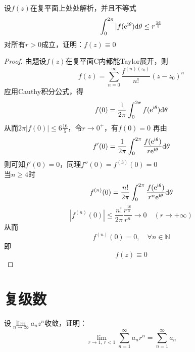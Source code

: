 \begin{proposition}

    设$f(z)$在复平面上处处解析，并且不等式
    $$\int_{0}^{2\pi}{|f(\mathrm{e^{\mathrm{i} \theta}})}\mathrm{d} \theta \leq r^{\frac{16}{5}} $$
    对所有$r > 0$成立，证明：$f(z) \equiv 0$

\end{proposition}

\begin{proof}

    由题设$f(z)$在复平面$\mathrm{C}$内都能\textup{Taylor}展开，则
    $$f(z) = \sum_{n=0}^{\infty}{\dfrac{f^{(n)(z_0)}}{n!}(z - z_0)^n}$$
    应用\textup{Cauthy}积分公式，得
    $$f(0) = \dfrac{1}{2\pi} \int_{0}^{2\pi}{f(\mathrm{e}^{\mathrm{i} \theta})}\mathrm{d} \theta$$
    从而$2\pi|f(0)| \leq 6{\frac{16}{5}}$，令$r\to0^{+}$，有$f(0) = 0$
    再由
    $$f'(0) = \dfrac{1}{2\pi} \int_{0}^{2\pi}{\dfrac{f(\mathrm{e}^{\mathrm{i} \theta})}{r\mathrm{e}^{\mathrm{i} \theta}}}\mathrm{d} \theta$$
    则可知$f'(0) = 0$，同理$f''(0) = f^{(3)}(0) = 0$\\
    当$n \geq 4$时
    $$f^{(n)}(0) =  \dfrac{n!}{2\pi} \int_{0}^{2\pi}{\dfrac{f(\mathrm{e}^{\mathrm{i}\theta})}{r^n \mathrm{e}^{\mathrm{i}\theta}}}\mathrm{d} \theta$$
    $$|f^{(n)}(0)| \leq \dfrac{n!}{2\pi} \dfrac{r^{\frac{16}{5}}}{r^n} \to 0\quad(r\to+\infty)$$
    从而
    $$f^{(n)}(0) = 0,\quad \forall n \in \mathbb{N}$$
    即
    $$f(z) \equiv 0$$
    
\end{proof}

\section{复级数}

\begin{proposition}

    设$\lim\limits_{n\to\infty}{a_nz^n}$收敛，证明：
    $$\lim_{r \to 1,\ r < 1}{\sum\limits_{n=1}^{\infty}{a_nr^n}} = \sum_{n=1}^{\infty}{a_n}$$

\end{proposition}

